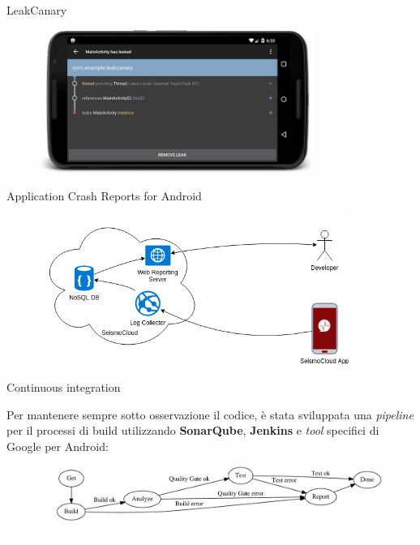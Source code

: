 \begin{frame}[c]{LeakCanary}

\begin{figure}[ht]
\centering
\includegraphics[width=0.8\textwidth]{dev/leakcanary}
\end{figure}

\end{frame}

\begin{frame}[c]{Application Crash Reports for Android}

\begin{figure}[ht]
\centering
\includegraphics[width=0.9\textwidth]{dev/acracollector}
\end{figure}

\end{frame}

\begin{frame}[c]{Continuous integration}

Per mantenere sempre sotto osservazione il codice, è stata sviluppata una \textit{pipeline} per il processi di build utilizzando \textbf{SonarQube}, \textbf{Jenkins} e \textit{tool} specifici di Google per Android:

\vspace{0.5cm}
\begin{figure}[ht]
\centering
\includegraphics[width=\textwidth]{CIStateMachine}
\end{figure}

\end{frame}

